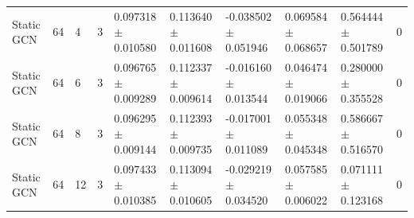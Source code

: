 \begin{tabular}{llllllllll}
Static GCN & 64 & 4 & 3 & 0.097318 $\pm$ 0.010580 & 0.113640 $\pm$ 0.011608 & -0.038502 $\pm$ 0.051946 & 0.069584 $\pm$ 0.068657 & 0.564444 $\pm$ 0.501789 & 0 \\
Static GCN & 64 & 6 & 3 & 0.096765 $\pm$ 0.009289 & 0.112337 $\pm$ 0.009614 & -0.016160 $\pm$ 0.013544 & 0.046474 $\pm$ 0.019066 & 0.280000 $\pm$ 0.355528 & 0 \\
Static GCN & 64 & 8 & 3 & 0.096295 $\pm$ 0.009144 & 0.112393 $\pm$ 0.009735 & -0.017001 $\pm$ 0.011089 & 0.055348 $\pm$ 0.045348 & 0.586667 $\pm$ 0.516570 & 0 \\
Static GCN & 64 & 12 & 3 & 0.097433 $\pm$ 0.010385 & 0.113094 $\pm$ 0.010605 & -0.029219 $\pm$ 0.034520 & 0.057585 $\pm$ 0.006022 & 0.071111 $\pm$ 0.123168 & 0 \\
\hline
\end{tabular}
